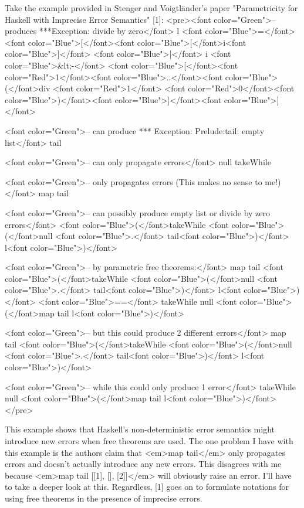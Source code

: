 Take the example provided in Stenger and Voigtländer's paper "Parametricity for Haskell with Imprecise Error Semantics" [1]:
<pre><font color="Green">-- produces ***Exception: divide by zero</font>
l <font color="Blue">=</font> <font color="Blue">[</font><font color="Blue">[</font>i<font color="Blue">]</font> <font color="Blue">|</font> i <font color="Blue">&lt;-</font> <font color="Blue">[</font><font color="Red">1</font><font color="Blue">..</font><font color="Blue">(</font>div <font color="Red">1</font> <font color="Red">0</font><font color="Blue">)</font><font color="Blue">]</font><font color="Blue">]</font>

<font color="Green">-- can produce *** Exception: Prelude:tail: empty list</font>
tail

<font color="Green">-- can only propagate errors</font>
null
takeWhile

<font color="Green">-- only propagates errors (This makes no sense to me!)</font>
map tail

<font color="Green">-- can possibly produce empty list or divide by zero errors</font>
<font color="Blue">(</font>takeWhile <font color="Blue">(</font>null <font color="Blue">.</font> tail<font color="Blue">)</font> l<font color="Blue">)</font>

<font color="Green">-- by parametric free theorems:</font>
map tail <font color="Blue">(</font>takeWhile <font color="Blue">(</font>null <font color="Blue">.</font> tail<font color="Blue">)</font> l<font color="Blue">)</font> <font color="Blue">==</font> takeWhile null <font color="Blue">(</font>map tail l<font color="Blue">)</font>

<font color="Green">-- but this could produce 2 different errors</font>
map tail <font color="Blue">(</font>takeWhile <font color="Blue">(</font>null <font color="Blue">.</font> tail<font color="Blue">)</font> l<font color="Blue">)</font>

<font color="Green">-- while this could only produce 1 error</font>
takeWhile null <font color="Blue">(</font>map tail l<font color="Blue">)</font></pre>

This example shows that Haskell's non-deterministic error semantics might introduce new errors when free theorems are used. The one problem I have with this example is the authors claim that <em>map tail</em> only propagates errors and doesn't actually introduce any new errors. This disagrees with me because <em>map tail [[1], [], [2]]</em> will obviously raise an error. I'll have to take a deeper look at this. Regardless, [1] goes on to formulate notations for using free theorems in the presence of imprecise errors.

